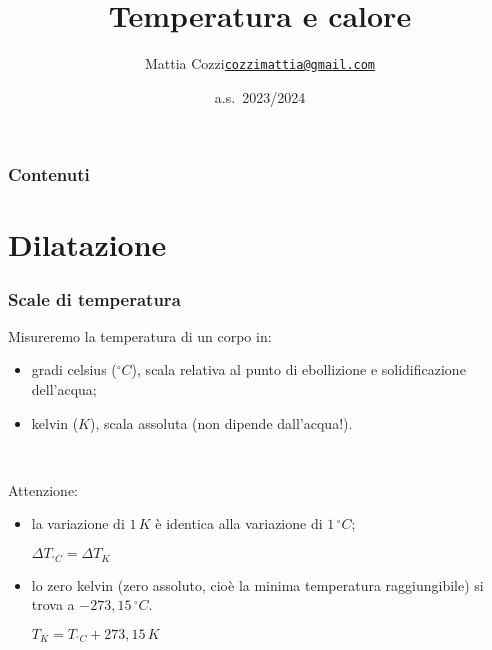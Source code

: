\documentclass[]{beamer}
\title{Temperatura e calore}
\author{\texorpdfstring{Mattia Cozzi\newline\href{mailto:cozzimattia@gmail.com}{\texttt{cozzimattia@gmail.com}}}{Mattia Cozzi}}
\date{a.s.~2023/2024}
\theoremstyle{plain}
\begin{document}
\begin{frame}
  \titlepage
\end{frame}





\begin{frame}
\frametitle{Contenuti}
\tableofcontents
\end{frame}


\section{Dilatazione}


\begin{frame}
\frametitle{Scale di temperatura}
Misureremo la temperatura di un corpo in:
\begin{itemize}
  \item \alert<1>{gradi celsius ($ ^\circ C $)}, scala relativa al punto di ebollizione e solidificazione dell'acqua;\pause
  \item \alert<2>{kelvin ($ K $)}, scala assoluta (non dipende dall'acqua!).\pause
\end{itemize}

~

Attenzione:
\begin{itemize}
  \item la variazione di $ 1 \, K $ è identica alla variazione di $ 1 \, ^\circ C $;
  \begin{center}
  $ \Delta T_{^\circ C} = \Delta T_K $
  \end{center}
  \pause
  \item lo zero kelvin (zero assoluto, cioè la minima temperatura raggiungibile) si trova a $ -273,15 \, ^\circ C $.
  \begin{center}
  $ T_K = T_{^\circ C} + 273,15 \, K $
  \end{center}
\end{itemize}
\end{frame}
\end{document}
